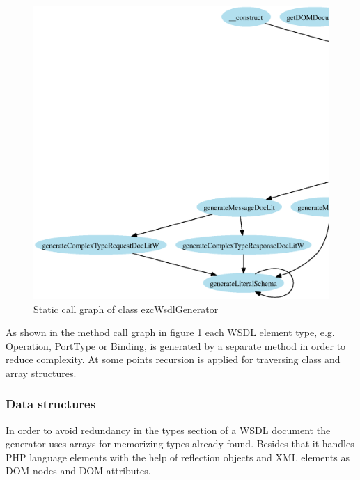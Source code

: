 \documentclass[10pt,final,a4paper,oneside]{article}
\begin{document}
\begin{figure}[htbp]
	\centering
		\includegraphics[width=1.00\textwidth]{figures/callgraph-Generators-class.WSDLGenerator.ps}
	\caption{Static call graph of class ezcWsdlGenerator}
	\label{fig:callgraph-Generators-class.WSDLGenerator}
\end{figure}

As shown in the method call graph
in figure \ref{fig:callgraph-Generators-class.WSDLGenerator}
each WSDL element type, e.g. Operation, PortType or Binding,
is generated by a separate method in order to reduce complexity.
At some points recursion is applied
for traversing class and array structures.


\subsubsection{Data structures}
In order to avoid redundancy in the types section of a WSDL document
the generator uses arrays for memorizing types already found.
Besides that it handles
PHP language elements with the help of reflection objects
and XML elements as DOM nodes and DOM attributes.
\end{document}
